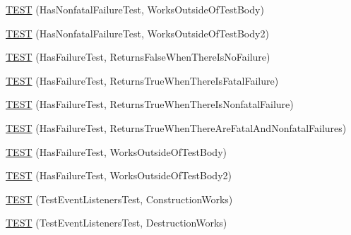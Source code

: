 \begin{DoxyCompactItemize}
\item 
\mbox{\hyperlink{_obj__test_2lib_2googletest-release-1_88_81_2googletest_2test_2gtest__unittest_8cc_a97a31bbf9d4d1f7f36021db7efed056a}{T\+E\+ST}} (Has\+Nonfatal\+Failure\+Test, Works\+Outside\+Of\+Test\+Body)
\item 
\mbox{\hyperlink{_obj__test_2lib_2googletest-release-1_88_81_2googletest_2test_2gtest__unittest_8cc_a1d352f5ce3c51840695c59733f8f642a}{T\+E\+ST}} (Has\+Nonfatal\+Failure\+Test, Works\+Outside\+Of\+Test\+Body2)
\item 
\mbox{\hyperlink{_obj__test_2lib_2googletest-release-1_88_81_2googletest_2test_2gtest__unittest_8cc_a3963284acb609756dee763d91b93aaad}{T\+E\+ST}} (Has\+Failure\+Test, Returns\+False\+When\+There\+Is\+No\+Failure)
\item 
\mbox{\hyperlink{_obj__test_2lib_2googletest-release-1_88_81_2googletest_2test_2gtest__unittest_8cc_a3226e1e613be7a832888a4a8f57fb02e}{T\+E\+ST}} (Has\+Failure\+Test, Returns\+True\+When\+There\+Is\+Fatal\+Failure)
\item 
\mbox{\hyperlink{_obj__test_2lib_2googletest-release-1_88_81_2googletest_2test_2gtest__unittest_8cc_af4d5faf224cfe1acb3d49612a4659b3b}{T\+E\+ST}} (Has\+Failure\+Test, Returns\+True\+When\+There\+Is\+Nonfatal\+Failure)
\item 
\mbox{\hyperlink{_obj__test_2lib_2googletest-release-1_88_81_2googletest_2test_2gtest__unittest_8cc_a80bc4f563ed06ee6b84f1370744fd3e6}{T\+E\+ST}} (Has\+Failure\+Test, Returns\+True\+When\+There\+Are\+Fatal\+And\+Nonfatal\+Failures)
\item 
\mbox{\hyperlink{_obj__test_2lib_2googletest-release-1_88_81_2googletest_2test_2gtest__unittest_8cc_a4ff927d7677fcdff6fd6af7e27c6aab3}{T\+E\+ST}} (Has\+Failure\+Test, Works\+Outside\+Of\+Test\+Body)
\item 
\mbox{\hyperlink{_obj__test_2lib_2googletest-release-1_88_81_2googletest_2test_2gtest__unittest_8cc_acb72846e1f7181d831d760128a763e08}{T\+E\+ST}} (Has\+Failure\+Test, Works\+Outside\+Of\+Test\+Body2)
\item 
\mbox{\hyperlink{_obj__test_2lib_2googletest-release-1_88_81_2googletest_2test_2gtest__unittest_8cc_a7b39d7fb43a28e8098af85e3ee51eece}{T\+E\+ST}} (Test\+Event\+Listeners\+Test, Construction\+Works)
\item 
\mbox{\hyperlink{_obj__test_2lib_2googletest-release-1_88_81_2googletest_2test_2gtest__unittest_8cc_a1d1592cafc34c09de7a810a7c4855162}{T\+E\+ST}} (Test\+Event\+Listeners\+Test, Destruction\+Works)
\item 

\end{DoxyCompactItemize}
